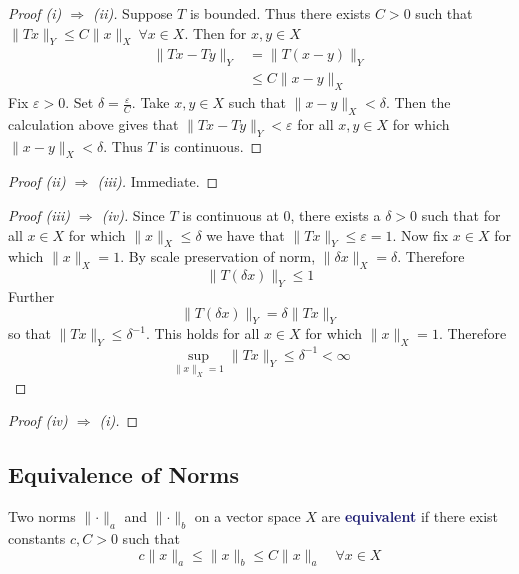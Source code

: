 \documentclass[11pt]{article}
\numberwithin{equation}{section}
\newcommand{\navy}[1]{\textcolor{MidnightBlue}{\bf #1}}
\theoremstyle{definition}
\theoremstyle{definition}
\newcommand\inv[1]{#1^{-1}}
\newcommand\norm[1]{\lVert#1\rVert}
\def\imp{\Rightarrow}
\newcommand{\1}{\mathbbm 1}
\def\d{\delta}
\newcommand{\e}{\varepsilon}
\begin{document}
\begin{proof}[Proof (i) $\imp$ (ii)]
	Suppose $T$ is bounded. Thus there exists $C > 0$ such that $\norm{Tx}_Y \leq C \norm{x}_X \ \forall x \in X$. Then for $x,y \in X$
	\begin{align*}
		\norm{Tx - Ty}_Y &= \norm{T(x-y)}_Y \tag{linearity} \\
		&\leq C\norm{x - y}_X \tag{bounded}
	\end{align*}
	Fix $\e > 0$. Set $\d = \frac{\e}{C}$. Take $x,y \in X$ such that $\norm{x-y}_X < \d$. Then the calculation above gives that $\norm{Tx - Ty}_Y < \e$ for all $x,y \in X$ for which $\norm{x-y}_X < \d$. Thus $T$ is continuous. 
\end{proof}

\begin{proof}[Proof (ii) $\imp$ (iii)] Immediate.
\end{proof}

\begin{proof}[Proof (iii) $\imp$ (iv)] 
	Since $T$ is continuous at $0$, there exists a $\d > 0$ such that for all $x \in X$ for which $\norm{x}_X \leq \d$ we have that $\norm{Tx}_Y \leq \e = 1$. Now fix $x \in X$ for which $\norm{x}_X = 1$. By scale preservation of norm, $\norm{\d x}_X = \d$. Therefore
	\begin{equation}
		\norm{T(\d x)}_Y \leq 1
	\end{equation}
	Further
	\begin{equation}
		\norm{T(\d x)}_Y = \d \norm{T x }_Y 
	\end{equation}
	so that $\norm{T x }_Y \leq \d^{-1}$. This holds for all $x \in X$ for which $\norm{x}_X = 1$. Therefore
	\begin{equation}
	 	\sup_{\norm{x}_X = 1} \norm{Tx}_Y \leq \inv{\d} < \infty
	\end{equation} 
\end{proof}

\begin{proof}[Proof (iv) $\imp$ (i)]

\end{proof} 

\subsection{Equivalence of Norms}

\begin{definition}[Equivalent]
	Two norms $\norm{\cdot}_a$ and $\norm{\cdot}_b$ on a vector space $X$ are \navy{equivalent} if there exist constants $c,C > 0$ such that 
	\begin{equation}
		c\norm{x}_a \leq \norm{x}_b \leq C \norm{x}_a \quad \forall x \in X
	\end{equation}
\end{definition}
\end{document}
